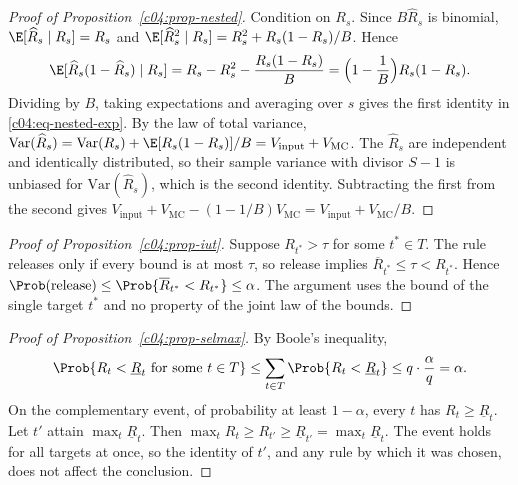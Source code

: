 \begin{proof}[Proof of Proposition~\ref{c04:prop-nested}]
Condition on $R_s$. Since $B\widehat R_s$ is binomial,
$\E[\widehat R_s \mid R_s] = R_s$ and $\E[\widehat R_s^2 \mid R_s] = R_s^2 + R_s(1-R_s)/B$.
Hence
\[
\E[\widehat R_s(1-\widehat R_s) \mid R_s] = R_s - R_s^2 - \frac{R_s(1-R_s)}{B}
= \Big(1 - \frac{1}{B}\Big)R_s(1-R_s).
\]
Dividing by $B$, taking expectations and averaging over $s$ gives the first identity in
\eqref{c04:eq-nested-exp}. By the law of total variance,
$\mathrm{Var}(\widehat R_s) = \mathrm{Var}(R_s) + \E[R_s(1-R_s)]/B =
V_{\mathrm{input}} + V_{\mathrm{MC}}$. The $\widehat R_s$ are independent and identically
distributed, so their sample variance with divisor $S-1$ is unbiased for
$\mathrm{Var}(\widehat R_s)$, which is the second identity. Subtracting the first from the
second gives $V_{\mathrm{input}} + V_{\mathrm{MC}} - (1-1/B)V_{\mathrm{MC}} =
V_{\mathrm{input}} + V_{\mathrm{MC}}/B$.
\end{proof}

\begin{proof}[Proof of Proposition~\ref{c04:prop-iut}]
Suppose $R_{t^\ast} > \tau$ for some $t^\ast \in T$. The rule releases only if every
bound is at most $\tau$, so release implies $\overline{R}_{t^\ast} \le \tau <
R_{t^\ast}$. Hence $\Prob(\text{release}) \le \Prob\{\overline{R}_{t^\ast} <
R_{t^\ast}\} \le \alpha$. The argument uses the bound of the single target $t^\ast$ and
no property of the joint law of the bounds.
\end{proof}

\begin{proof}[Proof of Proposition~\ref{c04:prop-selmax}]
By Boole's inequality,
\[
\Prob\{R_t < \underline{R}_t \ \text{for some}\ t \in T\} \le
\sum_{t \in T}\Prob\{R_t < \underline{R}_t\} \le q\cdot\frac{\alpha}{q} = \alpha .
\]
On the complementary event, of probability at least $1-\alpha$, every $t$ has
$R_t \ge \underline{R}_t$. Let $t'$ attain $\max_t \underline{R}_t$. Then
$\max_t R_t \ge R_{t'} \ge \underline{R}_{t'} = \max_t \underline{R}_t$. The event holds
for all targets at once, so the identity of $t'$, and any rule by which it was chosen,
does not affect the conclusion.
\end{proof}
